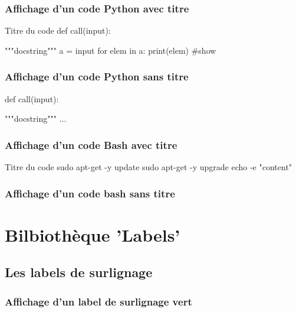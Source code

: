 \subsection{Affichage d'un code Python avec titre}


\begin{Python}{Titre du code}
def call(input):

  """docstring"""
  a = input
  for elem in a:
    print(elem) #show
\end{Python}
\subsection{Affichage d'un code Python sans titre}


\begin{Python}
def call(input):

  """docstring"""
  ...
\end{Python}


\subsection{Affichage d'un code Bash avec titre}


\begin{Bash}{Titre du code}
sudo apt-get -y update
sudo apt-get -y upgrade
echo -e "content"
\end{Bash}
\subsection{Affichage d'un code bash sans titre}






\chapter{Bilbiothèque 'Labels'}

\section{Les labels de surlignage}

\subsection{Affichage d'un label de surlignage vert}

